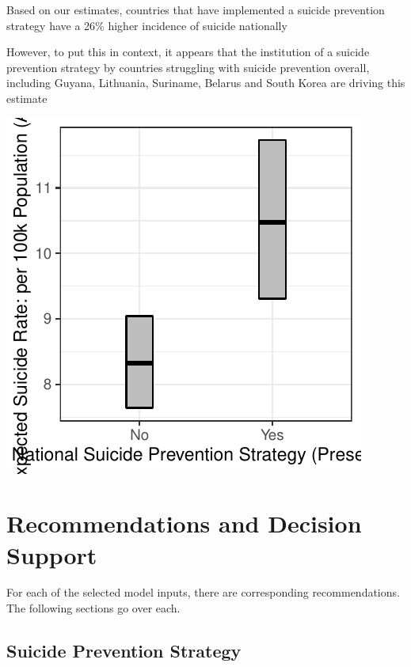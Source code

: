 \documentclass[]{article}
\begin{document}
Based on our estimates, countries that have implemented a suicide
prevention strategy have a 26\% higher incidence of suicide nationally

However, to put this in context, it appears that the institution of a
suicide prevention strategy by countries struggling with suicide
prevention overall, including Guyana, Lithuania, Suriname, Belarus and
South Korea are driving this estimate

\begin{center}\includegraphics{Project_Report_files/figure-latex/sstrat_plot-1} \end{center}

\section{Recommendations and Decision
Support}\label{recommendations-and-decision-support}

For each of the selected model inputs, there are corresponding
recommendations. The following sections go over each.

\subsection{Suicide Prevention
Strategy}\label{suicide-prevention-strategy}
\end{document}

